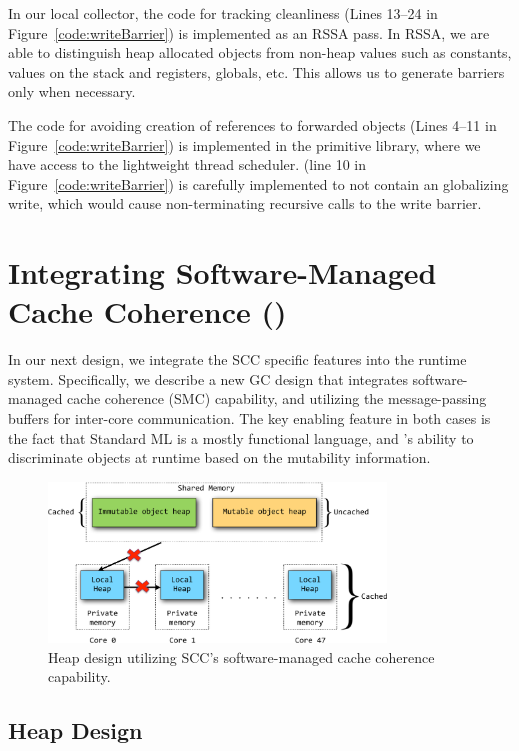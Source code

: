 In our local collector, the code for tracking cleanliness (Lines 13--24 in
Figure~\ref{code:writeBarrier}) is implemented as an RSSA pass. In RSSA, we are
able to distinguish heap allocated objects from non-heap values such as
constants, values on the stack and registers, globals, etc. This allows us to
generate barriers only when necessary.

The code for avoiding creation of references to forwarded objects (Lines 4--11
in Figure~\ref{code:writeBarrier}) is implemented in the primitive library,
where we have access to the lightweight thread scheduler.
 (line 10 in Figure~\ref{code:writeBarrier}) is
carefully implemented to not contain an globalizing write, which would cause
non-terminating recursive calls to the write barrier.

\section{Integrating Software-Managed Cache Coherence (\smc)}

In our next \MMSCC design, we integrate the SCC specific features into the
runtime system. Specifically, we describe a new GC design that integrates
software-managed cache coherence (SMC) capability, and utilizing the
message-passing buffers for inter-core communication. The key enabling feature
in both cases is the fact that Standard ML is a mostly functional language, and
\MM's ability to discriminate objects at runtime based on the mutability
information.

\begin{figure}[t]
\centering
\includegraphics[width=0.8\textwidth]{Figures/SMC_Collector.pdf}
\caption{Heap design utilizing SCC's software-managed cache coherence capability.}
\label{fig:smc}
\end{figure}

\subsection{Heap Design}

